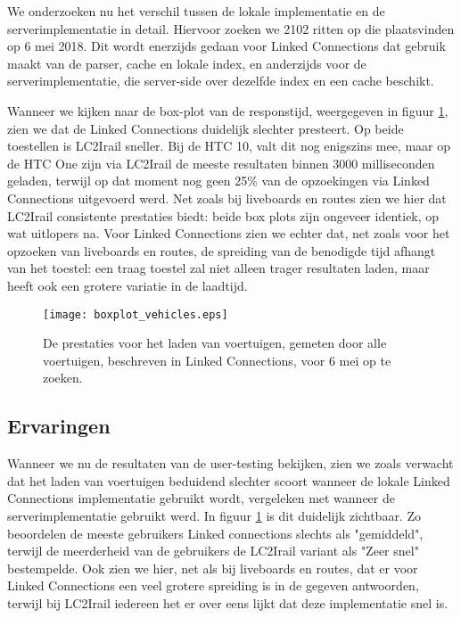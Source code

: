 We onderzoeken nu het verschil tussen de lokale implementatie en de serverimplementatie in detail. Hiervoor zoeken we 2102 ritten op die plaatsvinden op 6 mei 2018. Dit wordt enerzijds gedaan voor Linked Connections dat gebruik maakt van de  parser, cache en lokale index, en anderzijds voor de serverimplementatie, die server-side over dezelfde index en een cache beschikt.

Wanneer we kijken naar de box-plot van de responstijd, weergegeven in figuur \ref{fig:vehicleboxplot}, zien we dat de Linked Connections duidelijk slechter presteert. Op beide toestellen is LC2Irail sneller. Bij de HTC 10, valt dit nog enigszins mee, maar op de HTC One zijn via LC2Irail de meeste resultaten binnen 3000 milliseconden geladen, terwijl op dat moment nog geen 25\% van de opzoekingen via Linked Connections uitgevoerd werd. Net zoals bij liveboards en routes zien we hier dat LC2Irail consistente prestaties biedt: beide box plots zijn ongeveer identiek, op wat uitlopers na. Voor Linked Connections zien we echter dat, net zoals voor het opzoeken van liveboards en routes, de spreiding van de benodigde tijd afhangt van het toestel: een traag toestel zal niet alleen trager resultaten laden, maar heeft ook een grotere variatie in de laadtijd.

\begin{figure}[h]
	\centering
	\texttt{[image: boxplot\_vehicles.eps]}
	\caption[Prestaties voor het laden van voertuigen]{De prestaties voor het laden van voertuigen, gemeten door alle voertuigen, beschreven in Linked Connections, voor 6 mei op te zoeken.}
	\label{fig:vehicleboxplot}
\end{figure}


\subsection{Ervaringen}
Wanneer we nu de resultaten van de user-testing bekijken, zien we zoals verwacht dat het laden van voertuigen beduidend slechter scoort wanneer de lokale Linked Connections implementatie gebruikt wordt, vergeleken met wanneer de serverimplementatie gebruikt werd. In figuur \ref{fig:vehicleboxplot} is dit duidelijk zichtbaar. Zo beoordelen de meeste gebruikers Linked connections slechts als "gemiddeld", terwijl de meerderheid van de gebruikers de LC2Irail variant als "Zeer snel" bestempelde. Ook zien we hier, net als bij liveboards en routes, dat er voor Linked Connections een veel grotere spreiding is in de gegeven antwoorden, terwijl bij LC2Irail iedereen het er over eens lijkt dat deze implementatie snel is.

